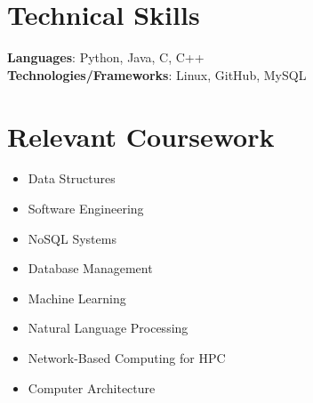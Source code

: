 \documentclass[letterpaper,11pt]{article}
\makeatletter
\newcommand{\resumeItem}[1]{
  \item\small{
    {#1 \vspace{-2pt}}
  }
}
\newcommand{\resumeSubheading}[4]{
  \vspace{-2pt}\item
    \begin{tabular*}{1.0\textwidth}[t]{l@{\extracolsep{\fill}}r}
      \textbf{#1} & \textbf{\small #2} \\
      \textit{\small#3} & \textit{\small #4} \\
    \end{tabular*}\vspace{-7pt}
}
\newcommand{\resumeSubHeadingListStart}{\begin{itemize}[leftmargin=0.0in, label={}]}
\newcommand{\resumeSubHeadingListEnd}{\end{itemize}}
\newcommand{\resumeItemListStart}{\begin{itemize}}
\newcommand{\resumeItemListEnd}{\end{itemize}\vspace{-5pt}}
\makeatother
\begin{document}
\section{Technical Skills}
 \begin{itemize}[leftmargin=0.15in, label={}]
    \small{\item{
     \textbf{Languages}{: Python, Java, C, C++}\\
     \textbf{Technologies/Frameworks}{: Linux, GitHub, MySQL} \\
    }}
 \end{itemize}
 \vspace{-16pt}



\section{Relevant Coursework}
        \begin{multicols}{3}
            \begin{itemize}[itemsep=-5pt, parsep=3pt]
                \item\small Data Structures
                \item Software Engineering
                \item NoSQL Systems
                \item Database Management
                \item Machine Learning
                \item \small Natural Language Processing
                \item \small Network-Based Computing for HPC
                \item Computer Architecture
            \end{itemize}
        \end{multicols}
        \vspace*{2.0\multicolsep}


        
\end{document}
